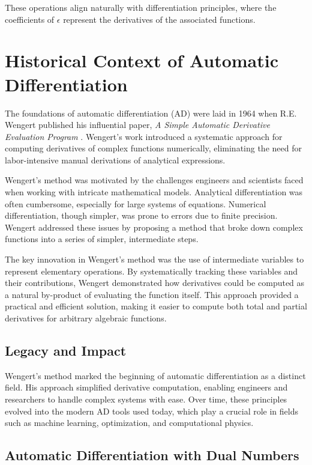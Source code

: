 \documentclass[a4paper,12pt]{article}
\begin{document}
These operations align naturally with differentiation principles, where the coefficients of \(\epsilon\) represent the derivatives of the associated functions.

\section{Historical Context of Automatic Differentiation}

The foundations of automatic differentiation (AD) were laid in 1964 when R.E. Wengert published his influential paper, \textit{A Simple Automatic Derivative Evaluation Program} \cite{wengert1964automatic}. Wengert's work introduced a systematic approach for computing derivatives of complex functions numerically, eliminating the need for labor-intensive manual derivations of analytical expressions.

Wengert's method was motivated by the challenges engineers and scientists faced when working with intricate mathematical models. Analytical differentiation was often cumbersome, especially for large systems of equations. Numerical differentiation, though simpler, was prone to errors due to finite precision. Wengert addressed these issues by proposing a method that broke down complex functions into a series of simpler, intermediate steps.

The key innovation in Wengert's method was the use of intermediate variables to represent elementary operations. By systematically tracking these variables and their contributions, Wengert demonstrated how derivatives could be computed as a natural by-product of evaluating the function itself. This approach provided a practical and efficient solution, making it easier to compute both total and partial derivatives for arbitrary algebraic functions.

\subsection{Legacy and Impact}

Wengert’s method marked the beginning of automatic differentiation as a distinct field. His approach simplified derivative computation, enabling engineers and researchers to handle complex systems with ease. Over time, these principles evolved into the modern AD tools used today, which play a crucial role in fields such as machine learning, optimization, and computational physics.


\subsection{Automatic Differentiation with Dual Numbers}
\end{document}
